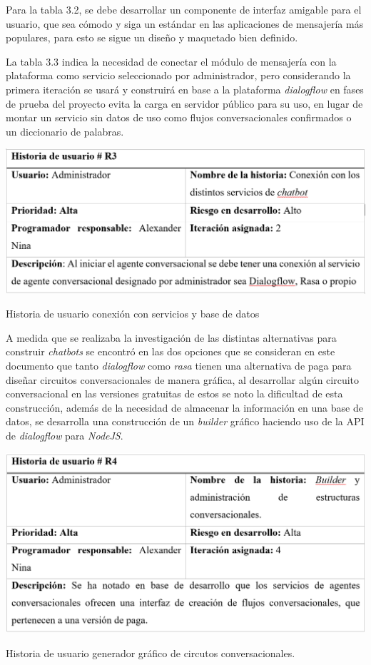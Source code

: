 \documentclass[letter, openright, 12pt]{book}
\begin{document}
\par
Para la tabla 3.2, se debe desarrollar un componente de interfaz amigable para el usuario, que sea cómodo y siga un estándar en las aplicaciones de mensajería más populares, para esto se sigue un diseño y maquetado bien definido. 


\par
La tabla 3.3 indica la necesidad de conectar el módulo de mensajería con la plataforma como servicio seleccionado por administrador, pero considerando la primera iteración se usará y construirá en base a la plataforma {\it dialogflow} en fases de prueba del proyecto evita la carga en servidor público para su uso, en lugar de montar un servicio sin datos de uso como flujos conversacionales confirmados o un diccionario de palabras. 

\begin{table}[!ht]
\includegraphics[width=1\textwidth]{tabla3_3}
\caption{Historia de usuario conexión con servicios y base de datos} 
\label{tab:tabla3_3} 
\end{table}

\par
A medida que se realizaba la investigación de las distintas alternativas para construir {\it chatbots} se encontró en las dos opciones que se consideran en este documento que tanto {\it dialogflow} como {\it rasa} tienen una alternativa de paga para diseñar circuitos conversacionales de manera gráfica, al desarrollar algún circuito conversacional en las versiones gratuitas de estos se noto la dificultad de esta construcción, además de la necesidad de almacenar la información en una base de datos, se desarrolla una construcción de un {\it builder} gráfico haciendo uso de la API de {\it dialogflow} para {\it NodeJS}.

\begin{table}[!ht]
\includegraphics[width=1\textwidth]{tabla3_4}
\caption{Historia de usuario generador gráfico de circutos conversacionales. } 
\label{tab:tabla3_4} 
\end{table}
\end{document}

